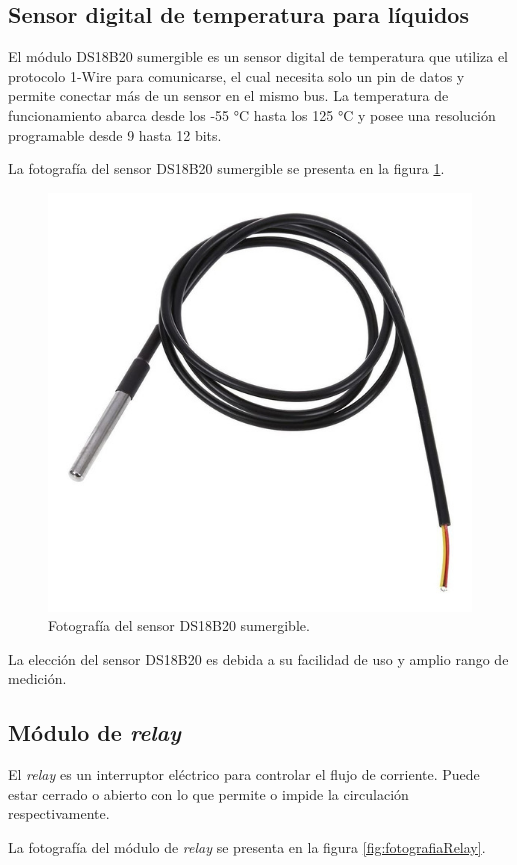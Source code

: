 \subsection{Sensor digital de temperatura para líquidos}

El módulo DS18B20 \citep{WEBSITE:DS18B20} sumergible es un sensor digital de temperatura que utiliza el protocolo 1-Wire \citep{WEBSITE:1WIRE} para comunicarse, el cual necesita solo un pin de datos y permite conectar más de un sensor en el mismo bus. La temperatura de funcionamiento abarca desde los -55 °C hasta los 125 °C y posee una resolución programable desde 9 hasta 12 bits.

La fotografía del sensor DS18B20 sumergible se presenta en la figura \ref{fig:fotografiaDS18B20}.

\begin{figure}[H]
	\centering
	\includegraphics[width=.5\textwidth]{./Figures/DS18B20.jpg}
	\caption{Fotografía del sensor DS18B20 sumergible\protect\footnotemark.}
	\label{fig:fotografiaDS18B20}
\end{figure}


La elección del sensor DS18B20 es debida a su facilidad de uso y amplio rango de medición.

\subsection{Módulo de \emph{relay}}

El \textit{relay} es un interruptor eléctrico para controlar el flujo de corriente. Puede estar cerrado o abierto con lo que permite o impide la circulación respectivamente.

La fotografía del módulo de \emph{relay} se presenta en la figura \ref{fig:fotografiaRelay}.

